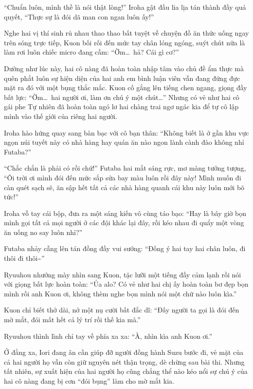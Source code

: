 \documentclass[../main.tex]{subfiles}
\begin{document}
``Chuẩn luôn, mình thề là nói thật lòng!'' Iroha gật đầu lia lịa tán thành đầy quả quyết, ``Thực sự là đói dã man con ngan luôn ấy!''

Nghe hai vị thí sinh rủ nhau thao thao bất tuyệt về chuyện đồ ăn thức uống ngay trên sóng trực tiếp, Kuon bối rối đến mức tay chân lóng ngóng, suýt chút nữa là làm rơi luôn chiếc micro đang cầm: ``Ờm\dots\ hả? Cái gì cơ?''

Dường như lúc này, hai cô nàng đã hoàn toàn nhập tâm vào chủ đề ẩm thực mà quên phắt luôn sự hiện diện của hai anh em bình luận viên vẫn đang đứng đực mặt ra đó với một bụng thắc mắc. Kuon cố gắng lên tiếng chen ngang, giọng đầy bất lực: ``Ờm\dots\ hai người ơi, làm ơn chú ý một chút\dots'' Nhưng có vẻ như hai cô gái phe Tự nhiên đã hoàn toàn ngó lơ hai chàng trai ngơ ngác kia để tự cô lập mình vào thế giới của riêng hai người.

Iroha hào hứng quay sang bàn bạc với cô bạn thân: ``Không biết là ở gần khu vực ngọn núi tuyết này có nhà hàng hay quán ăn nào ngon lành cành đào không nhỉ Futaba?''

``Chắc chắn là phải có rồi chứ!'' Futaba hai mắt sáng rực, mơ màng tưởng tượng, ``Ôi trời ơi mình đói đến mức sắp sửa bay màu luôn rồi đây này! Mình muốn đi càn quét sạch sẽ, ăn sập hết tất cả các nhà hàng quanh cái khu này luôn mới bõ tức!''

Iroha vỗ tay cái bộp, đưa ra một sáng kiến vô cùng táo bạo: ``Hay là bây giờ bọn mình gọi tất cả mọi người ở các đội khác lại đây, rồi kéo nhau đi quẩy một vòng ăn uống no say luôn nhỉ?''

Futaba nhảy cẫng lên tán đồng đầy vui sướng: ``Đống ý hai tay hai chân luôn, đi thôi đi thôi\~{}''

Ryuuhou nhướng mày nhìn sang Kuon, tặc lưỡi một tiếng đầy cảm lạnh rồi nói với giọng bất lực hoàn toàn: ``Ủa alo? Có vẻ như hai chị ấy hoàn toàn bơ đẹp bọn mình rồi anh Kuon ơi, không thèm nghe bọn mình nói một chữ nào luôn kìa.''

Kuon chỉ biết thở dài, nở một nụ cười bất đắc dĩ: ``Đấy người ta gọi là đói đến mờ mắt, đói mất hết cả lý trí rồi thế kia mà.''

Ryuuhou thình lình chỉ tay về phía xa xa: ``À, nhìn kìa anh Kuon ơi.''

Ở đằng xa, Iori đang ân cần giúp đỡ người đồng hành Suzu bước đi, vẻ mặt của cả hai người họ vẫn còn giữ nguyên nét thận trọng, dè chừng sau bài thi. Nhưng tất nhiên, sự xuất hiện của hai người họ cũng chẳng thể nào kéo nổi sự chú ý của hai cô nàng đang bị cơn ``đói bụng'' làm cho mờ mắt kia.
\end{document}
